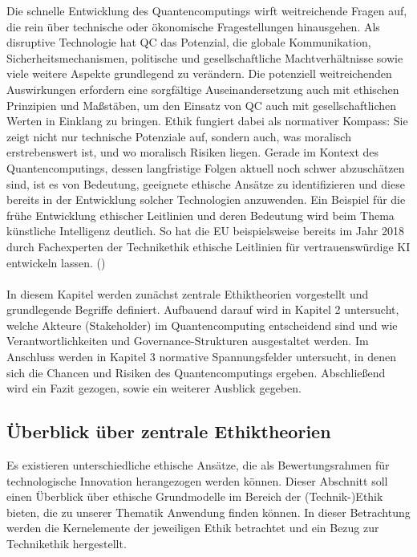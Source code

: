 Die schnelle Entwicklung des Quantencomputings wirft weitreichende Fragen auf, die rein über technische oder ökonomische Fragestellungen hinausgehen. Als disruptive Technologie hat QC das Potenzial, die globale Kommunikation, Sicherheitsmechanismen, politische und gesellschaftliche Machtverhältnisse sowie viele weitere Aspekte grundlegend zu verändern. Die potenziell weitreichenden Auswirkungen erfordern eine sorgfältige Auseinandersetzung auch mit ethischen Prinzipien und Maßstäben, um den Einsatz von QC auch mit gesellschaftlichen Werten in Einklang zu bringen. Ethik fungiert dabei als normativer Kompass: Sie zeigt nicht nur technische Potenziale auf, sondern auch, was moralisch erstrebenswert ist, und wo moralisch Risiken liegen. Gerade im Kontext des Quantencomputings, dessen langfristige Folgen aktuell noch schwer abzuschätzen sind, ist es von Bedeutung, geeignete ethische Ansätze zu identifizieren und diese bereits in der Entwicklung solcher Technologien anzuwenden. Ein Beispiel für die frühe Entwicklung ethischer Leitlinien und deren Bedeutung wird beim Thema künstliche Intelligenz deutlich. So hat die EU beispielsweise bereits im Jahr 2018 durch Fachexperten der Technikethik ethische Leitlinien für vertrauenswürdige KI entwickeln lassen. (\cite{european_commission_directorate_general_for_communications_networks_content_and_technology_ethik-leitlinien_2019})
\\
\\
In diesem Kapitel werden zunächst zentrale Ethiktheorien vorgestellt und grundlegende Begriffe definiert. Aufbauend darauf wird in Kapitel 2 untersucht, welche Akteure (Stakeholder) im Quantencomputing entscheidend sind und wie Verantwortlichkeiten und Governance-Strukturen ausgestaltet werden. Im Anschluss werden in Kapitel 3  normative Spannungsfelder untersucht, in denen sich die Chancen und Risiken des Quantencomputings ergeben. Abschließend wird ein Fazit gezogen, sowie ein weiterer Ausblick gegeben.

\subsection{Überblick über zentrale Ethiktheorien}

Es existieren unterschiedliche ethische Ansätze, die als Bewertungsrahmen für technologische Innovation herangezogen werden können. Dieser Abschnitt soll einen Überblick über ethische Grundmodelle im Bereich der (Technik-)Ethik bieten, die zu unserer Thematik Anwendung finden können. In dieser Betrachtung werden die Kernelemente der jeweiligen Ethik betrachtet und ein Bezug zur Technikethik hergestellt.

